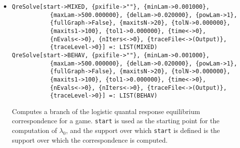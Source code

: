 \begin{itemize}
\item{}
\protect \large \begin{verbatim}
QreSolve[start->MIXED, {pxifile->""}, {minLam->0.001000}, 
           {maxLam->500.000000}, {delLam->0.020000}, {powLam->1}, 
           {fullGraph->False}, {maxitsN->20}, {tolN->0.000000}, 
           {maxits1->100}, {tol1->0.000000}, {time<->0}, 
           {nEvals<->0}, {nIters<->0}, {traceFile<->(Output)}, 
           {traceLevel->0}] =: LIST(MIXED) 
QreSolve[start->BEHAV, {pxifile->""}, {minLam->0.001000}, 
           {maxLam->500.000000}, {delLam->0.020000}, {powLam->1}, 
           {fullGraph->False}, {maxitsN->20}, {tolN->0.000000}, 
           {maxits1->100}, {tol1->0.000000}, {time<->0}, 
           {nEvals<->0}, {nIters<->0}, {traceFile<->(Output)}, 
           {traceLevel->0}] =: LIST(BEHAV) 
\end{verbatim}\normalsize

\bd 
Computes a branch of the logistic quantal response equilibrium
correspondence for a game. \verb+start+ is
used as the starting point for the computation of $\lambda_{0}$, and
the support over which \verb+start+ is defined is the support over
which the correspondence is computed.


\end{itemize}
